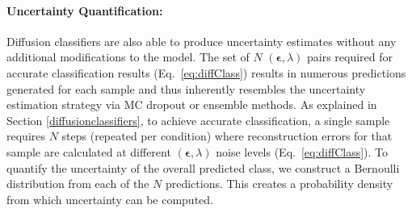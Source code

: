 \paragraph{Uncertainty Quantification:} \label{uncertainty}
Diffusion classifiers are also able to produce uncertainty estimates without any additional modifications to the model. The set of $N$ $(\bm{\epsilon}, \lambda)$ pairs required for accurate classification results (Eq.~\ref{eq:diffClass}) results in numerous predictions generated for each sample and thus inherently resembles the  uncertainty estimation strategy via MC dropout or ensemble methods. As explained in Section \ref{diffusionclassifiers}, to achieve accurate classification, a single sample requires $N$ steps (repeated per condition) where reconstruction errors for that sample are calculated at different $(\bm{\epsilon}, \lambda)$ noise levels  (Eq.~\ref{eq:diffClass}). To quantify the uncertainty of the overall predicted class,  %
we construct a Bernoulli distribution from each of the $N$ predictions. This creates a probability density from which uncertainty can be computed. %
